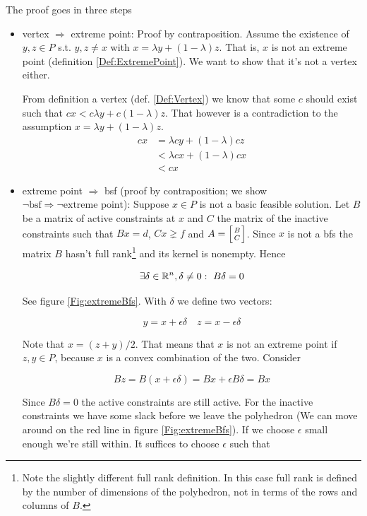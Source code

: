 \begin{pr} The proof goes in three steps
\begin{itemize}
\item vertex $\Rightarrow$ extreme point: Proof by contraposition. Assume the existence of $y,z \in P$ s.t. $y,z\neq x$ with $x= \lambda y + (1-\lambda )z$. That is, $x$ is not an extreme point (definition \ref{Def:ExtremePoint}). We want to show that it's not a vertex either.

From definition a vertex (def. \ref{Def:Vertex}) we know that some $c$ should exist such that $c x < c \lambda y  + c (1-\lambda) z$. That however is a contradiction to the assumption $x= \lambda y + (1-\lambda )z$.
\begin{align*}
cx &= \lambda cy +(1-\lambda)cz\\
   &< \lambda cx + (1-\lambda)cx\\
   &< cx
\end{align*}

\item extreme point $\Rightarrow$ bsf (proof by contraposition; we show $\neg \text{bsf} \Rightarrow \neg \text{extreme point}$): Suppose $x\in P$ is not a basic feasible solution. Let $B$ be a matrix of active constraints at $x$ and $C$ the matrix of the inactive constraints such that $Bx=d$, $Cx\gneq f$ and $A = \left[B\atop C\right]$. Since $x$ is not a bfs the matrix $B$ hasn't full rank\footnote{Note the slightly different full rank definition. In this case full rank is defined by the number of dimensions of the polyhedron, not in terms of the rows and columns of $B$.} and its kernel is nonempty. Hence

\[\exists \delta \in \R^n, \delta \neq 0:\ B\delta =0\]

See figure \ref{Fig:extremeBfs}. With $\delta$ we define two vectors:

\[y=x+\epsilon \delta \quad z = x-\epsilon \delta\]

Note that $x=(z+y)/2$. That means that $x$ is not an extreme point if $z,y \in P$, because $x$ is a convex combination of the two. Consider 

\[Bz = B(x+\epsilon \delta) = Bx + \epsilon B\delta = Bx\]

Since $B\delta = 0$ the active constraints are still active. For the inactive constraints we have some slack before we leave the polyhedron (We can move around on the red line in figure \ref{Fig:extremeBfs}). If we choose $\epsilon$ small enough we're still within. It suffices to choose $\epsilon$ such that 


\end{itemize}
\end{pr}
